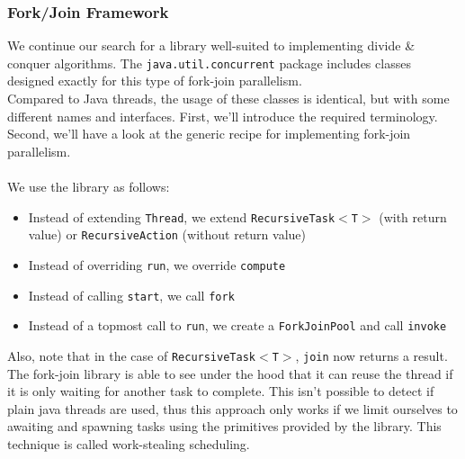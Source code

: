 \documentclass[main.tex]{subfiles}
\begin{document}
\subsubsection{Fork/Join Framework} \label{Fork/Join Framework}
We continue our search for a library well-suited to implementing divide \& conquer algorithms. The \texttt{java.util.concurrent} package includes classes designed exactly for this type of fork-join parallelism.\\
Compared to Java threads, the usage of these classes is identical, but with some different names and interfaces. First, we'll introduce the required terminology. Second, we'll have a look at the generic recipe for implementing fork-join parallelism.\\
\\
We use the library as follows:
\begin{itemize}
    \item Instead of extending \texttt{Thread}, we extend \texttt{RecursiveTask$<$T$>$} (with return value) or \texttt{RecursiveAction} (without return value)
    \item Instead of overriding \texttt{run}, we override \texttt{compute}
    \item Instead of calling \texttt{start}, we call \texttt{fork}
    \item Instead of a topmost call to \texttt{run}, we create a \texttt{ForkJoinPool} and call \texttt{invoke}
\end{itemize}
Also, note that in the case of \texttt{RecursiveTask$<$T$>$}, \texttt{join} now returns a result.\\
The fork-join library is able to see under the hood that it can reuse the thread if it is only waiting for another task to complete. This isn't possible to detect if plain java threads are used, thus this approach only works if we limit ourselves to awaiting and spawning tasks using the primitives provided by the library. This technique is called work-stealing scheduling.
\end{document}
